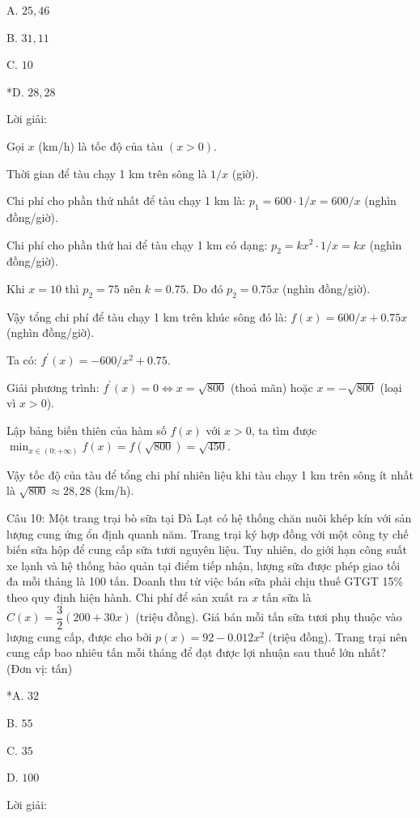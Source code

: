 \documentclass[a4paper,12pt]{article}
\begin{document}
A. \(25,46\)

B. \(31,11\)

C. \(10\)

*D. \(28,28\)

Lời giải:


Gọi \(x\) (km/h) là tốc độ của tàu \((x > 0)\).

Thời gian để tàu chạy 1 km trên sông là \(1/x\) (giờ).

Chi phí cho phần thứ nhất để tàu chạy 1 km là: \(p_1=600 \cdot 1/x=600/x\) (nghìn đồng/giờ).

Chi phí cho phần thứ hai để tàu chạy 1 km có dạng: \(p_2=k x^2 \cdot 1/x=k x\) (nghìn đồng/giờ).

Khi \(x=10\) thì \(p_2=75\) nên \(k=0.75\). Do đó \(p_2=0.75 x\) (nghìn đồng/giờ).

Vậy tổng chi phí để tàu chạy 1 km trên khúc sông đó là: \(f(x)=600/x+0.75 x\) (nghìn đồng/giờ).

Ta có: \(f^{\prime}(x)=-600/x^2+0.75\).

        Giải phương trình: \(f^{\prime}(x)=0 \Leftrightarrow x=\sqrt{800}\) (thoả mãn) hoặc \(x=-\sqrt{800}\) (loại vì \(x>0\)).

        Lập bảng biến thiên của hàm số \(f(x)\) với \(x>0\), ta tìm được \(\min_{x \in(0 ;+\infty)} f(x)=f(\sqrt{800})=\sqrt{450}\).

        Vậy tốc độ của tàu để tổng chi phí nhiên liệu khi tàu chạy 1 km trên sông ít nhất là \(\sqrt{800} \approx 28,28\) (km/h).




Câu 10: Một trang trại bò sữa tại Đà Lạt có hệ thống chăn nuôi khép kín với sản lượng cung ứng ổn định quanh năm. Trang trại ký hợp đồng với một công ty chế biến sữa hộp để cung cấp sữa tươi nguyên liệu. Tuy nhiên, do giới hạn công suất xe lạnh và hệ thống bảo quản tại điểm tiếp nhận, lượng sữa được phép giao tối đa mỗi tháng là 100 tấn. Doanh thu từ việc bán sữa phải chịu thuế GTGT 15\% theo quy định hiện hành. Chi phí để sản xuất ra \(x\)  tấn sữa là \(C(x) = \dfrac{3}{2}(200 + 30x)\) (triệu đồng). Giá bán mỗi tấn sữa tươi phụ thuộc vào lượng cung cấp, được cho bởi \(p(x) = 92 - 0.012x^2\) (triệu đồng). Trang trại nên cung cấp bao nhiêu tấn mỗi tháng để đạt được lợi nhuận sau thuế lớn nhất? (Đơn vị: tấn)

*A. \(32\)

B. \(55\)

C. \(35\)

D. \(100\)

Lời giải:
\end{document}
